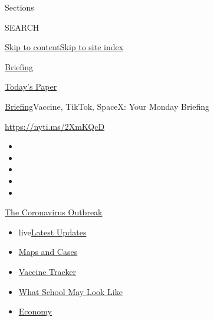 Sections

SEARCH

\protect\hyperlink{site-content}{Skip to
content}\protect\hyperlink{site-index}{Skip to site index}

\href{https://www.nytimes3xbfgragh.onion/interactive/2018/briefing/global-morning-briefing-newsletter-signup.html}{Briefing}

\href{https://myaccount.nytimes3xbfgragh.onion/auth/login?response_type=cookie\&client_id=vi}{}

\href{https://www.nytimes3xbfgragh.onion/section/todayspaper}{Today's
Paper}

\href{/interactive/2018/briefing/global-morning-briefing-newsletter-signup.html}{Briefing}\textbar{}Vaccine,
TikTok, SpaceX: Your Monday Briefing

\url{https://nyti.ms/2XmKQcD}

\begin{itemize}
\item
\item
\item
\item
\item
\end{itemize}

\href{https://www.nytimes3xbfgragh.onion/news-event/coronavirus?action=click\&pgtype=Article\&state=default\&region=TOP_BANNER\&context=storylines_menu}{The
Coronavirus Outbreak}

\begin{itemize}
\tightlist
\item
  live\href{https://www.nytimes3xbfgragh.onion/2020/08/02/world/coronavirus-updates.html?action=click\&pgtype=Article\&state=default\&region=TOP_BANNER\&context=storylines_menu}{Latest
  Updates}
\item
  \href{https://www.nytimes3xbfgragh.onion/interactive/2020/us/coronavirus-us-cases.html?action=click\&pgtype=Article\&state=default\&region=TOP_BANNER\&context=storylines_menu}{Maps
  and Cases}
\item
  \href{https://www.nytimes3xbfgragh.onion/interactive/2020/science/coronavirus-vaccine-tracker.html?action=click\&pgtype=Article\&state=default\&region=TOP_BANNER\&context=storylines_menu}{Vaccine
  Tracker}
\item
  \href{https://www.nytimes3xbfgragh.onion/interactive/2020/07/29/us/schools-reopening-coronavirus.html?action=click\&pgtype=Article\&state=default\&region=TOP_BANNER\&context=storylines_menu}{What
  School May Look Like}
\item
  \href{https://www.nytimes3xbfgragh.onion/live/2020/07/31/business/stock-market-today-coronavirus?action=click\&pgtype=Article\&state=default\&region=TOP_BANNER\&context=storylines_menu}{Economy}
\end{itemize}


